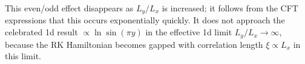 \documentclass[11pt]{iopart}
\begin{document}
This even/odd effect disappears as $L_y/L_x$ is increased; it follows from the CFT expressions that this occurs exponentially quickly.  It does not approach the celebrated 1d result\cite{Cardy} $\propto \ln\sin (\pi y)$ in the effective 1d limit $L_y/L_x\to\infty$, because the RK Hamiltonian becomes gapped with correlation length $\xi\propto L_x$ in this limit. 



\end{document}
